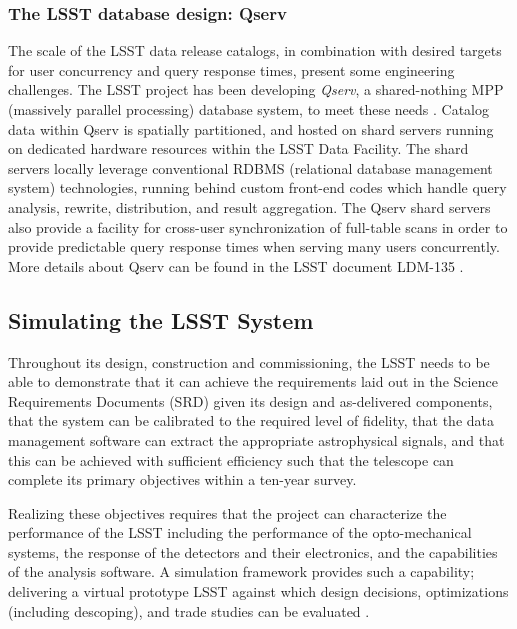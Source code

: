 \subsubsection{The LSST database design: Qserv}
\label{sec:Qserv}

The scale of the LSST data release catalogs, in combination with desired targets for user concurrency
and query response times, present some engineering challenges. The LSST project has been developing
\emph{Qserv}, a shared-nothing MPP (massively parallel processing) database system, to meet these needs
\citep{Wang:2011:QDS:2063348.2063364, 2014era..conf30303B}.
Catalog data within Qserv is spatially partitioned, and hosted on shard servers running on dedicated hardware
resources within the LSST Data Facility.  The shard servers locally leverage conventional RDBMS (relational
database management system) technologies, running behind custom front-end codes which handle query
analysis, rewrite, distribution, and result aggregation.  The Qserv shard servers also provide a facility for
cross-user synchronization of full-table scans in order to provide predictable query response times when
serving many users concurrently. More details about Qserv can be found in
the LSST document LDM-135 \citep{LDM-135}.


\subsection{Simulating the LSST System}

Throughout its design, construction and commissioning, the LSST needs
to be able to demonstrate that it can achieve the requirements laid out
in the Science Requirements Documents (SRD) given its design and
as-delivered components, that the system can be calibrated to the
required level of fidelity, that the data management software can
extract the appropriate astrophysical signals, and that this can be
achieved with sufficient efficiency such that the telescope can
complete its primary objectives within a ten-year survey.


Realizing these objectives requires that the project can characterize
the performance of the LSST including the performance of the
opto-mechanical systems, the response of the detectors and their
electronics, and the capabilities of the analysis software. A
simulation framework provides such a capability; delivering a virtual
prototype LSST against which design decisions, optimizations
(including descoping), and trade studies can be evaluated \citep{2014SPIE.9150E..14C}.


